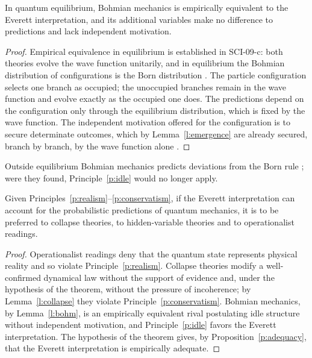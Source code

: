 \documentclass{situationist-preprint}
\begin{document}
\begin{lemma}\label{l:bohm}
In quantum equilibrium, Bohmian mechanics is empirically equivalent to the Everett interpretation, and its additional variables make no difference to predictions and lack independent motivation.
\end{lemma}

\begin{proof}
Empirical equivalence in equilibrium is established in SCI-09-c: both theories evolve the wave function unitarily, and in equilibrium the Bohmian distribution of configurations is the Born distribution \citep{DurrGoldsteinZanghi1992}. The particle configuration selects one branch as occupied; the unoccupied branches remain in the wave function and evolve exactly as the occupied one does. The predictions depend on the configuration only through the equilibrium distribution, which is fixed by the wave function. The independent motivation offered for the configuration is to secure determinate outcomes, which by Lemma~\ref{l:emergence} are already secured, branch by branch, by the wave function alone \citep{BrownWallace2005}.
\end{proof}

Outside equilibrium Bohmian mechanics predicts deviations from the Born rule \citep{Valentini1991}; were they found, Principle~\ref{p:idle} would no longer apply.

\begin{theorem}\label{t:comparative}
Given Principles~\ref{p:realism}--\ref{p:conservatism}, if the Everett interpretation can account for the probabilistic predictions of quantum mechanics, it is to be preferred to collapse theories, to hidden-variable theories and to operationalist readings.
\end{theorem}

\begin{proof}
Operationalist readings deny that the quantum state represents physical reality and so violate Principle~\ref{p:realism}. Collapse theories modify a well-confirmed dynamical law without the support of evidence and, under the hypothesis of the theorem, without the pressure of incoherence; by Lemma~\ref{l:collapse} they violate Principle~\ref{p:conservatism}. Bohmian mechanics, by Lemma~\ref{l:bohm}, is an empirically equivalent rival postulating idle structure without independent motivation, and Principle~\ref{p:idle} favors the Everett interpretation. The hypothesis of the theorem gives, by Proposition~\ref{p:adequacy}, that the Everett interpretation is empirically adequate.
\end{proof}
\end{document}
